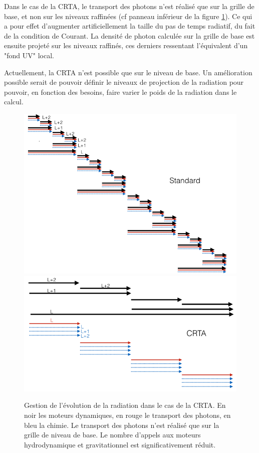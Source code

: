 Dans le cas de la \ac{CRTA}, le transport des photons n'est réalisé que sur la grille de base, et non sur les niveaux raffinées (cf panneau inférieur de la figure \ref{fig:CRTA}).
Ce qui a pour effet d'augmenter artificiellement la taille du pas de temps radiatif, du fait de la condition de Courant.
La densité de photon calculée sur la grille de base est ensuite projeté sur les niveaux raffinés, ces derniers ressentant l'équivalent d'un "fond UV" local.

Actuellement, la \ac{CRTA} n'est possible que sur le niveau de base.
Un amélioration possible serait de pouvoir définir le niveaux de projection de la radiation pour pouvoir, en fonction des besoins, faire varier le poids de la radiation dans le calcul.


\begin{figure}
\includegraphics[width=.95\linewidth]{img/02/revz_crad_std.png}
\includegraphics[width=.95\linewidth]{img/02/revz_crad.png}
\caption[CRTA]{Gestion de l'évolution de la radiation dans le cas de la \ac{CRTA}.
En noir les moteurs dynamiques, en rouge le transport des photons, en bleu la chimie.
Le transport des photons n'est réalisé que sur la grille de niveau de base.
Le nombre d'appels aux moteurs hydrodynamique et gravitationnel est significativement réduit. 
\label{fig:CRTA}}
\end{figure}
